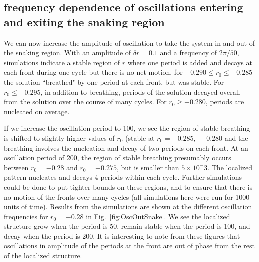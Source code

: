 \documentclass[pre,preprint,superscriptaddress]{revtex4-1}
\begin{document}
\subsection{frequency dependence of oscillations entering and exiting the snaking region}
We can now increase the amplitude of oscillation to take the system in and out of the snaking region.  With an amplitude of $\delta r=0.1$ and a frequency of $2\pi/50$, simulations indicate a stable region of $r$ where one period is added and decays at each front during one cycle but there is no net motion. for $ -0.290\le r_0\le-0.285$ the solution ``breathed" by one period at each front, but was stable.  For $r_0 \le -0.295$, in addition to breathing, periods of the solution decayed overall from the solution over the course of many cycles. For $r_0 \ge -0.280$,  periods are nucleated on average. 

If we increase the oscillation period to 100, we see the region of stable breathing is shifted to slightly higher values of $r_0$ (stable at $r_0=-0.285, \, -0.280$ and the breathing involves the nucleation and decay of two periods on each front.  At an oscillation period of 200, the region of stable breathing presumably  occurs between $r_0=-0.28$ and $r_0=-0.275$, but is smaller than $5\times 10^-3$.  The localized pattern nucleates and decays 4 periods within each cycle.  Further simulations could be done to put tighter bounds on these regions, and to ensure that there is no motion of the fronts over many cycles (all simulations here were run for 1000 units of time).   Results from the simulations are shown at the different oscillation frequencies for $r_0=-0.28$ in Fig.~\ref{fig:OscOutSnake}.  We see the localized structure grow when the period is 50, remain stable when the period is 100, and decay when the period is 200.   It is interesting to note from these figures that oscillations in amplitude of the periods at the front are out of phase from the rest of the localized structure.
\end{document}
